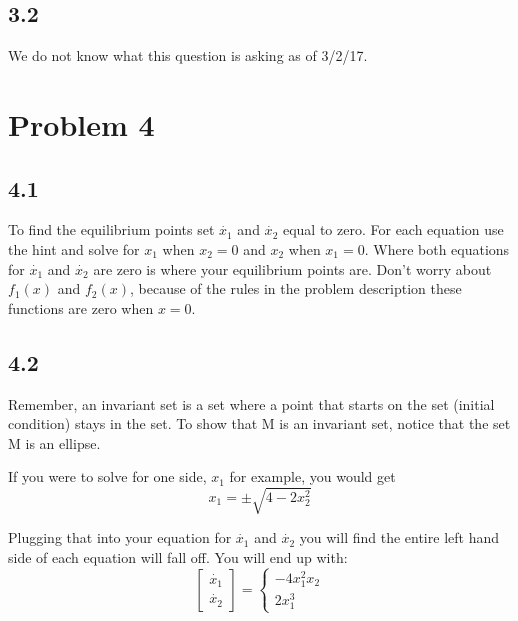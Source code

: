 \documentclass[12pt]{article}
\begin{document}
\subsection*{3.2}
We do not know what this question is asking as of 3/2/17.

\section*{Problem 4}
\subsection*{4.1}
To find the equilibrium points set $\dot{x_1}$ and $\dot{x_2}$ equal to zero. For each equation use the hint and solve for $x_1$ when $x_2=0$ and $x_2$ when $x_1=0$. Where both equations for $\dot{x_1}$ and $\dot{x_2}$ are zero is where your equilibrium points are. Don't worry about $f_1(x)$ and $f_2(x)$, because of the rules in the problem description these functions are zero when $x=0$.

\subsection*{4.2}
Remember, an invariant set is a set where a point that starts on the set (initial condition) stays in the set.
To show that M is an invariant set, notice that the set M is an ellipse. 


If you were to solve for one side, $x_1$ for example, you would get
$$x_1=\pm\sqrt{4-2x_2^2}$$

Plugging that into your equation for $\dot{x_1}$ and $\dot{x_2}$ you will find the entire left hand side of each equation will fall off. You will end up with:
$$\begin{bmatrix}\dot{x_1} \\ 
\dot{x_2}\end{bmatrix}=
\begin{cases}-4x_1^2x_2\\ 
2x_1^3
\end{cases}$$ 
\end{document}
